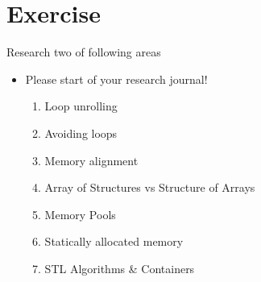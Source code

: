 \part{Exercise}
\frame{\partpage}

\begin{frame}{Research two of  following areas}
\begin{itemize}
	\item Please start of your research journal!
\begin{enumerate}
	\item Loop unrolling
	\item Avoiding loops
	\item Memory alignment
	\item Array of Structures vs Structure of Arrays
	\item Memory Pools
	\item Statically allocated memory
	\item STL Algorithms \& Containers
\end{enumerate}
\end{itemize}
\end{frame}